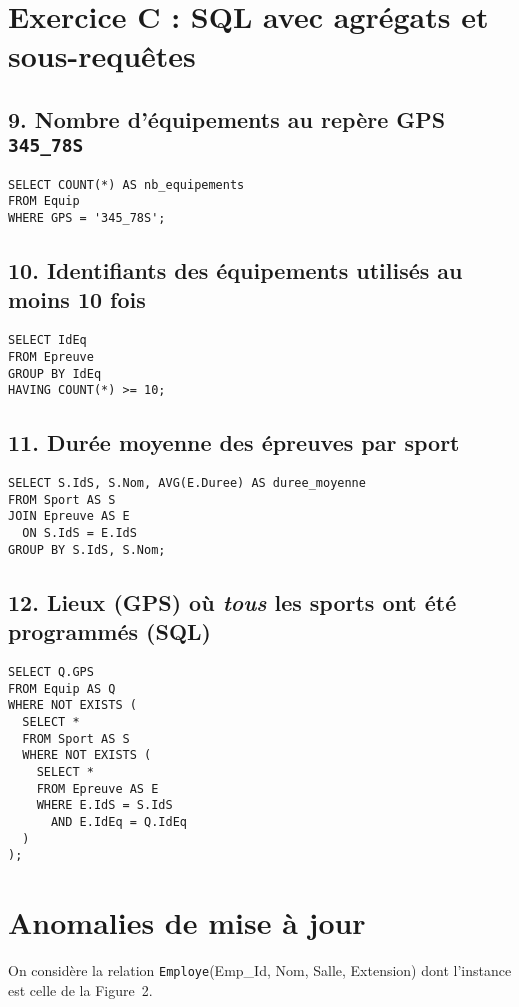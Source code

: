 \documentclass[a4paper,12pt]{article}
\begin{document}
\section*{Exercice C : SQL avec agrégats et sous-requêtes}

\subsection*{9. Nombre d'équipements au repère GPS \texttt{345\_78S}}
\begin{verbatim}
SELECT COUNT(*) AS nb_equipements
FROM Equip
WHERE GPS = '345_78S';
\end{verbatim}

\subsection*{10. Identifiants des équipements utilisés au moins 10 fois}
\begin{verbatim}
SELECT IdEq
FROM Epreuve
GROUP BY IdEq
HAVING COUNT(*) >= 10;
\end{verbatim}

\subsection*{11. Durée moyenne des épreuves par sport}
\begin{verbatim}
SELECT S.IdS, S.Nom, AVG(E.Duree) AS duree_moyenne
FROM Sport AS S
JOIN Epreuve AS E
  ON S.IdS = E.IdS
GROUP BY S.IdS, S.Nom;
\end{verbatim}

\subsection*{12. Lieux (GPS) où \emph{tous} les sports ont été programmés (SQL)}
\begin{verbatim}
SELECT Q.GPS
FROM Equip AS Q
WHERE NOT EXISTS (
  SELECT *
  FROM Sport AS S
  WHERE NOT EXISTS (
    SELECT *
    FROM Epreuve AS E
    WHERE E.IdS = S.IdS
      AND E.IdEq = Q.IdEq
  )
);
\end{verbatim}

\section*{Anomalies de mise à jour}
On considère la relation \texttt{Employe}(Emp\_Id, Nom, Salle, Extension) dont l'instance est celle de la Figure 2.
\end{document}
